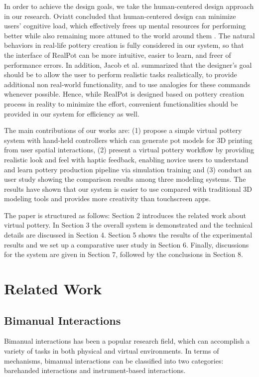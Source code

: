 \documentclass{svjour3}                     %
\begin{document}
In order to achieve the design goals, we take the human-centered design approach in our research.
Oviatt concluded that human-centered design can minimize users’ cognitive load, which effectively frees up mental resources for performing better while also remaining more attuned to the world around them \cite{oviatt2006human}.
The natural behaviors in real-life pottery creation is fully considered in our system, so that the interface of RealPot can be more intuitive, easier to learn, and freer of performance errors.
In addition, Jacob et al. \cite{Jacob2008Reality} summarized that the designer's goal should be to allow the user to perform realistic tasks realistically, to provide additional non real-world functionality, and to use analogies for these commands whenever possible.
Hence, while RealPot is designed based on pottery creation process in reality to minimize the effort, convenient functionalities should be provided in our system for efficiency as well.

The main contributions of our works are:
%
(1) propose a simple virtual pottery system with hand-held controllers which can generate pot models for 3D printing from user spatial interactions,
%
(2) present a virtual pottery workflow by providing realistic look and feel with haptic feedback, enabling novice users to understand and learn pottery production pipeline via simulation training 
%
and (3) conduct an user study showing the comparison results among three modeling systems. The results have shown that our system is easier to use compared with traditional 3D modeling tools and provides more creativity than touchscreen apps.

The paper is structured as follows:
Section 2 introduces the related work about virtual pottery.
In Section 3 the overall system is demonstrated and the technical details are discussed in Section 4.
Section 5 shows the results of the experimental results and we set up a comparative user study in Section 6.
Finally, discussions for the system are given in Section 7, followed by the conclusions in Section 8.

\section{Related Work}
\label{sec:2}

\subsection{Bimanual Interactions}
\label{sec:2.1}
Bimanual interactions has been a popular research field, which can accomplish a variety of tasks in both physical and virtual environments.
In terms of mechanisms, bimanual interactions can be classified into two categories: barehanded interactions and instrument-based interactions.
\end{document}
